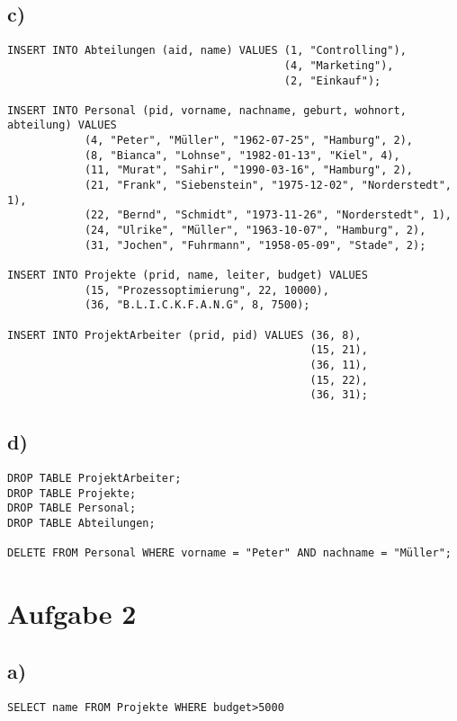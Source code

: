 \documentclass[a4paper,12pt,]{scrartcl}
\begin{document}
\subsection*{c)}
\begin{verbatim}
INSERT INTO Abteilungen (aid, name) VALUES (1, "Controlling"),
                                           (4, "Marketing"),
                                           (2, "Einkauf");

INSERT INTO Personal (pid, vorname, nachname, geburt, wohnort, abteilung) VALUES
            (4, "Peter", "Müller", "1962-07-25", "Hamburg", 2),
            (8, "Bianca", "Lohnse", "1982-01-13", "Kiel", 4),
            (11, "Murat", "Sahir", "1990-03-16", "Hamburg", 2),
            (21, "Frank", "Siebenstein", "1975-12-02", "Norderstedt", 1),
            (22, "Bernd", "Schmidt", "1973-11-26", "Norderstedt", 1),
            (24, "Ulrike", "Müller", "1963-10-07", "Hamburg", 2),
            (31, "Jochen", "Fuhrmann", "1958-05-09", "Stade", 2);

INSERT INTO Projekte (prid, name, leiter, budget) VALUES
            (15, "Prozessoptimierung", 22, 10000),
            (36, "B.L.I.C.K.F.A.N.G", 8, 7500);

INSERT INTO ProjektArbeiter (prid, pid) VALUES (36, 8),
                                               (15, 21),
                                               (36, 11),
                                               (15, 22),
                                               (36, 31);
\end{verbatim}

\newpage
\subsection*{d)}
\begin{verbatim}
DROP TABLE ProjektArbeiter;
DROP TABLE Projekte;
DROP TABLE Personal;
DROP TABLE Abteilungen;

DELETE FROM Personal WHERE vorname = "Peter" AND nachname = "Müller";
\end{verbatim}

\section{Aufgabe 2}

\subsection*{a)}
\begin{verbatim}
SELECT name FROM Projekte WHERE budget>5000
\end{verbatim}
\end{document}
